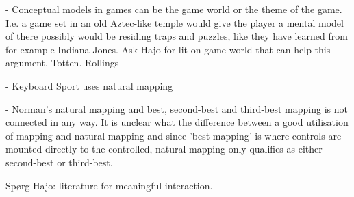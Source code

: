 - Conceptual models in games can be the game world or the theme of the game. I.e. a game set in an old Aztec-like temple would give the player a mental model of there possibly would be residing traps and puzzles, like they have learned from for example Indiana Jones. Ask Hajo for lit on game world that can
help this argument. Totten. Rollings

- Keyboard Sport uses natural mapping

- Norman's natural mapping and best, second-best and third-best mapping is not connected in any way. It is unclear what the difference between a good utilisation of mapping and natural mapping and since 'best mapping' is where controls are mounted directly to the controlled, natural mapping only qualifies as either second-best or third-best.

Spørg Hajo: literature for meaningful interaction.

